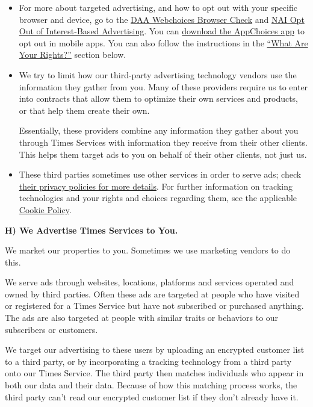 \begin{itemize}
\item
  For more about targeted advertising, and how to opt out with your
  specific browser and device, go to the
  \href{http://optout.aboutads.info/?c=2\&lang=EN}{DAA Webchoices
  Browser Check} and
  \href{http://optout.networkadvertising.org/?c=1}{NAI Opt Out of
  Interest-Based Advertising}. You can
  \href{https://youradchoices.com/appchoices}{download the AppChoices
  app} to opt out in mobile apps. You can also follow the instructions
  in the \protect\hyperlink{anchor-question4}{``What Are Your Rights?''}
  section below.
\item
  We try to limit how our third-party advertising technology vendors use
  the information they gather from you. Many of these providers require
  us to enter into contracts that allow them to optimize their own
  services and products, or that help them create their own.

  Essentially, these providers combine any information they gather about
  you through Times Services with information they receive from their
  other clients. This helps them target ads to you on behalf of their
  other clients, not just us.
\item
  These third parties sometimes use other services in order to serve
  ads; check \href{/privacy/third-party}{their privacy policies for more
  details}. For further information on tracking technologies and your
  rights and choices regarding them, see the applicable
  \href{https://www.nytimes.com/subscription/dg-cookie-policy/cookie-policy.html}{Cookie
  Policy}.
\end{itemize}

\textbf{H) We Advertise Times Services to You.}

We market our properties to you. Sometimes we use marketing vendors to
do this.

We serve ads through websites, locations, platforms and services
operated and owned by third parties. Often these ads are targeted at
people who have visited or registered for a Times Service but have not
subscribed or purchased anything. The ads are also targeted at people
with similar traits or behaviors to our subscribers or customers.

We target our advertising to these users by uploading an encrypted
customer list to a third party, or by incorporating a tracking
technology from a third party onto our Times Service. The third party
then matches individuals who appear in both our data and their data.
Because of how this matching process works, the third party can't read
our encrypted customer list if they don't already have it.

